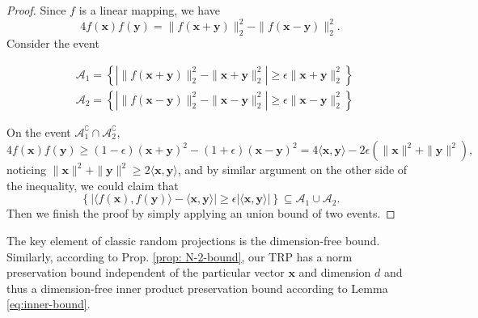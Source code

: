 \begin{proof}
Since $f$ is a linear mapping, we have
\[
4f(\mathbf{x})f(\mathbf{y}) = \|f(\mathbf{x}+\mathbf{y})\|^2_2-  \|f(\mathbf{x}-\mathbf{y})\|^2_2.
\]
Consider the event

\begin{equation}
\begin{aligned}
 &\mathcal{A} _1=  \left\{ |\|f(\mathbf{x}+\mathbf{y})\|^2_2-\|\mathbf{x}+\mathbf{y}\|^2_2|\ge \epsilon \|\mathbf{x}+\mathbf{y}\|_2^2 \right\}\\
 &\mathcal{A} _2=  \left\{ | \|f(\mathbf{x}-\mathbf{y})\|^2_2-\|\mathbf{x}-\mathbf{y}\|^2_2|\ge \epsilon \|\mathbf{x}-\mathbf{y}\|_2^2 \right\} \nonumber
 \end{aligned}
 \end{equation}
 
 On the event $\mathcal{A}_1^\complement \cap\mathcal{A}_2^\complement$, 
 \[
 4f(\mathbf{x})f(\mathbf{y})  \ge (1-\epsilon) (\mathbf{x}+\mathbf{y})^2 - (1+\epsilon) (\mathbf{x}-\mathbf{y})^2 = 4 \langle \mathbf{x}, \mathbf{y}\rangle -2\epsilon (\|\mathbf{x}\|^2+\|\mathbf{y}\|^2),
 \]
 noticing $\|\mathbf{x}\|^2+\|\mathbf{y}\|^2\ge 2\langle \mathbf{x},  \mathbf{y}\rangle$, and by similar argument on the other side of the inequality, we could claim that 
\[
\left\{|\langle f(\mathbf{x}), f(\mathbf{y})\rangle - \langle \mathbf{x}, \mathbf{y}\rangle|\ge \epsilon |\langle \mathbf{x}, \mathbf{y}\rangle|\right\} \subseteq  \mathcal{A}_1 \cup \mathcal{A}_2. 
\]
Then we finish the proof by simply applying an union bound of two events. 
\end{proof}
\begin{remark}
The key element of classic random projections is the dimension-free bound. Similarly, according to Prop. \ref{prop: N-2-bound}, our TRP has a norm preservation bound independent of the particular vector  $\mathbf{x}$ and dimension $d$ and thus a dimension-free inner product preservation bound according to Lemma \ref{eq:inner-bound}. 
\end{remark}


